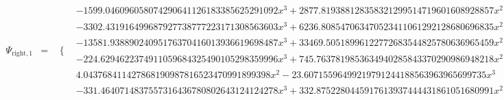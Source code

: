 \documentclass{article}
\begin{document}
\begin{landscape}
\begin{eqnarray*}
\begin{array}{cc}
\end{array}\\ 
\Psi_{\text{right},1} & = & \begin{array}{cc}
 \{ & 
\begin{array}{cc}
 -1599.046096058074290641126183385625291092 x^3+2877.819388128358321299514719601608928857 x^2-1700.950199809841424684455725913710048217 x+330.2719714944733831231517014079413329287 & x\geq \frac{1}{2}\land x<\frac{5}{8} \\
 -3302.431916499687927738777223171308563603 x^3+6236.808547063470523411061292128680696835 x^2-3903.531390148715696350079129323702173215 x+810.6457540659949283338871595309755818894 & x\geq \frac{5}{8}\land x<\frac{3}{4} \\
 -13581.93889024095176370416013936619698487 x^3+33469.50518996122772683544825780636965459 x^2-27405.90833630696877829507590676136139896 x+7455.703606601791993664312992185238515184 & x\geq \frac{3}{4}\land x<\frac{7}{8} \\
 -224.6294622374911059684325490105298359996 x^3+745.7637819853634940285843370290986948218 x^2-819.4309647946550691198133544993102019250 x+298.2966450467826810596615664807413431028 & x\geq \frac{7}{8}\land x<1 \\
 4.043768411427868190987816523470991899398 x^2-23.60715596499219791244188563963965699735 x^3 & x\geq 0\land x<\frac{1}{4} \\
 -331.4640714837557316436780802643124124278 x^3+332.8752280445917613937444431861051680991 x^2-106.6925581568137840267715268391909464566 x+10.93143761711138289607115808439361240528 & x\geq \frac{1}{4}\land x<\frac{1}{2}
\end{array}


\end{array}
\end{eqnarray*}
\end{landscape}
\end{document}
